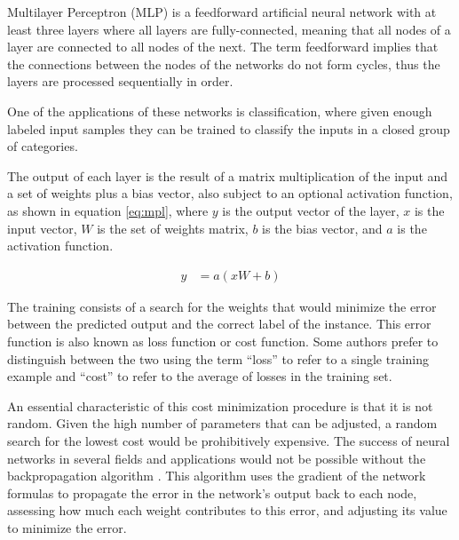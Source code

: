Multilayer Perceptron (MLP) \cite{rosenblatt_perceptron:_1958} is a feedforward artificial neural network with at least three layers where all layers are fully-connected, meaning that all nodes of a layer are connected to all nodes of the next.
The term feedforward implies that the connections between the nodes of the networks do not form cycles, thus the layers are processed sequentially in order.

One of the applications of these networks is classification, where given enough labeled input samples they can be trained to classify the inputs in a closed group of categories.

The output of each layer is the result of a matrix multiplication of the input and a set of weights plus a bias vector, also subject to an optional activation function, as shown in equation \ref{eq:mpl}, where $y$ is the output vector of the layer, $x$ is the input vector, $W$ is the set of weights matrix, $b$ is the bias vector, and $a$ is the activation function.

\begin{align}
\label{eq:mpl}     
y &= a(x W + b)
\end{align}

The training consists of a search for the weights that would minimize the error between the predicted output and the correct label of the instance. This error function is also known as loss function or cost function. Some authors prefer to distinguish between the two using the term ``loss'' to refer to a single training example and ``cost'' to refer to the average of losses in the training set.


An essential characteristic of this cost minimization procedure is that it is not random. Given the high number of parameters that can be adjusted, a random search for the lowest cost would be prohibitively expensive.
The success of neural networks in several fields and applications would not be possible without the backpropagation algorithm \cite{rumelhart_general_1986}. 
This algorithm uses the gradient of the network formulas to propagate the error in the network's output back to each node, assessing how much each weight contributes to this error, and adjusting its value to minimize the error.

